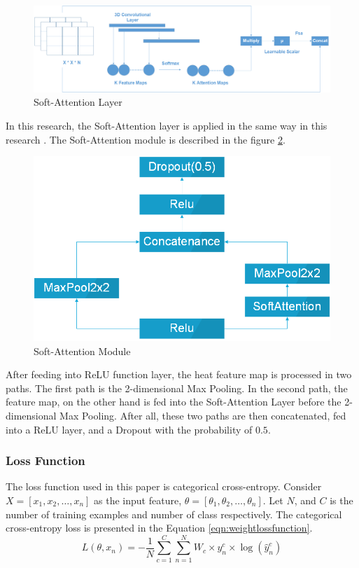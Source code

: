 \documentclass[sensors,article,submit,pdftex,moreauthors]{Definitions/mdpi}
\begin{document}
\begin{figure}[H]
	\centering
	\includegraphics[width=1\linewidth]{Definitions/SoftAttention}
	\caption{Soft-Attention Layer}
	\label{fig:soft-attention}
\end{figure}

In this research, the Soft-Attention layer is applied in the same way in this research \cite{03358}. The Soft-Attention module is described in the figure \ref{fig:soft-attention-block}.

\begin{figure}[H]
	\centering
	\includegraphics[width=0.5\linewidth]{Definitions/SoftAttentionBlock}
	\caption{Soft-Attention Module}
	\label{fig:soft-attention-block}
\end{figure}

After feeding into ReLU function layer, the heat feature map is processed in two paths. The first path is the 2-dimensional Max Pooling. In the second path, the feature map, on the other hand is fed into the Soft-Attention Layer before the 2-dimensional Max Pooling. After all, these two paths are then concatenated, fed into a ReLU layer, and a Dropout with the probability of $0.5$.


\subsubsection{Loss Function}
The loss function used in this paper is categorical cross-entropy. Consider $X = [x_1, x_2, \dots, x_n]$ as the input feature, $\theta = [\theta_1, \theta_2, \dots, \theta_n]$. Let $N$, and $C$ is the number of training examples and number of class respectively. The categorical cross-entropy loss is presented in the Equation \ref{eqn:weightlossfunction}.
\begin{equation}
	\label{eqn:weightlossfunction}
	L(\theta, x_n) = -\frac{1}{N}\sum_{c=1}^{C}\sum_{n=1}^{N}W_c\times y^c_n \times \log(\hat{y}^c_n)
\end{equation}
\end{document}
